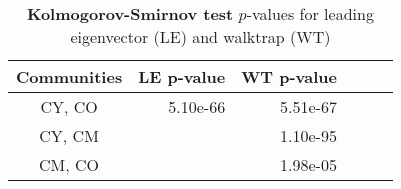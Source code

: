 \begin{table}[htb]
\small
\centering
\caption[Kolmogorov-Smirnov test]{\textbf{Kolmogorov-Smirnov test} $p$-values for leading eigenvector (LE) and walktrap (WT)}
\label{tab:n3-pvalues2}
\vspace*{5mm}
\begin{tabular}{crrrrr}
	\toprule
	 Communities & LE p-value & WT p-value\\
	\midrule 
    CY, CO & 5.10e-66 & 5.51e-67\\
    CY, CM &          & 1.10e-95\\
    CM, CO &          & 1.98e-05\\ 
	\bottomrule
\end{tabular}
\end{table}